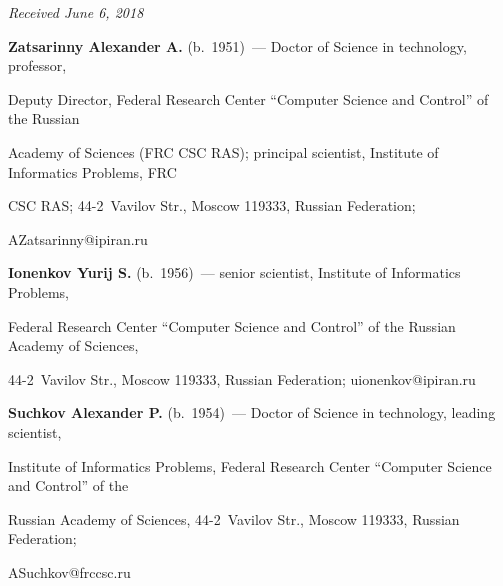 \vspace*{-3pt}



\hfill{\small\textit{Received June 6, 2018}}     

     

     \Contr

     

\noindent

\textbf{Zatsarinny Alexander A.} (b.\ 1951)~--- Doctor of Science in technology, professor, 

Deputy Director, Federal Research Center ``Computer Science and Control'' of the Russian 

Academy of Sciences (FRC CSC RAS); principal scientist, Institute of Informatics Problems, FRC 

CSC RAS; 44-2~Vavilov Str., Moscow 119333, Russian Federation; 

\mbox{AZatsarinny@ipiran.ru}



\vspace{3pt} 



\noindent

\textbf{Ionenkov Yurij S.} (b.\ 1956)~--- senior scientist, Institute of Informatics Problems, 

Federal Research Center ``Computer Science and Control'' of the Russian Academy of Sciences, 

44-2~Vavilov Str., Moscow 119333, Russian Federation; \mbox{uionenkov@ipiran.ru} 



\vspace{3pt} 



\noindent

\textbf{Suchkov Alexander P.} (b.\ 1954)~--- Doctor of Science in technology, leading scientist, 

Institute of Informatics Problems, Federal Research Center ``Computer Science and Control'' of the 

Russian Academy of Sciences, 44-2~Vavilov Str., Moscow 119333, Russian Federation; 

\mbox{ASuchkov@frccsc.ru}

     

\label{end\stat}





\renewcommand{\bibname}{\protect\rm Литература}

    

